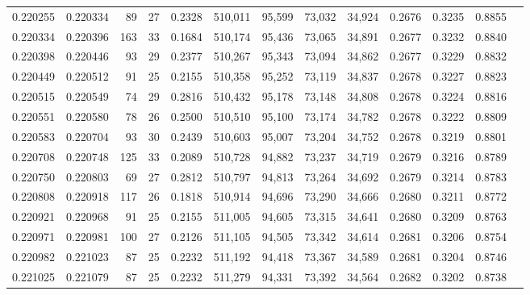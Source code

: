 \begin{tabular}{rrrrrrrrrrrrr}
0.220255 & 0.220334 &  89 &  27 &                                     0.2328 & 510,011 &  95,599 &  73,032 &  34,924 & 0.2676 & 0.3235 & 0.8855 \\
0.220334 & 0.220396 & 163 &  33 &                                     0.1684 & 510,174 &  95,436 &  73,065 &  34,891 & 0.2677 & 0.3232 & 0.8840 \\
0.220398 & 0.220446 &  93 &  29 &                                     0.2377 & 510,267 &  95,343 &  73,094 &  34,862 & 0.2677 & 0.3229 & 0.8832 \\
0.220449 & 0.220512 &  91 &  25 &                                     0.2155 & 510,358 &  95,252 &  73,119 &  34,837 & 0.2678 & 0.3227 & 0.8823 \\
0.220515 & 0.220549 &  74 &  29 &                                     0.2816 & 510,432 &  95,178 &  73,148 &  34,808 & 0.2678 & 0.3224 & 0.8816 \\
0.220551 & 0.220580 &  78 &  26 &                                     0.2500 & 510,510 &  95,100 &  73,174 &  34,782 & 0.2678 & 0.3222 & 0.8809 \\
0.220583 & 0.220704 &  93 &  30 &                                     0.2439 & 510,603 &  95,007 &  73,204 &  34,752 & 0.2678 & 0.3219 & 0.8801 \\
0.220708 & 0.220748 & 125 &  33 &                                     0.2089 & 510,728 &  94,882 &  73,237 &  34,719 & 0.2679 & 0.3216 & 0.8789 \\
0.220750 & 0.220803 &  69 &  27 &                                     0.2812 & 510,797 &  94,813 &  73,264 &  34,692 & 0.2679 & 0.3214 & 0.8783 \\
0.220808 & 0.220918 & 117 &  26 &                                     0.1818 & 510,914 &  94,696 &  73,290 &  34,666 & 0.2680 & 0.3211 & 0.8772 \\
0.220921 & 0.220968 &  91 &  25 &                                     0.2155 & 511,005 &  94,605 &  73,315 &  34,641 & 0.2680 & 0.3209 & 0.8763 \\
0.220971 & 0.220981 & 100 &  27 &                                     0.2126 & 511,105 &  94,505 &  73,342 &  34,614 & 0.2681 & 0.3206 & 0.8754 \\
0.220982 & 0.221023 &  87 &  25 &                                     0.2232 & 511,192 &  94,418 &  73,367 &  34,589 & 0.2681 & 0.3204 & 0.8746 \\
0.221025 & 0.221079 &  87 &  25 &                                     0.2232 & 511,279 &  94,331 &  73,392 &  34,564 & 0.2682 & 0.3202 & 0.8738 \\

\end{tabular}
